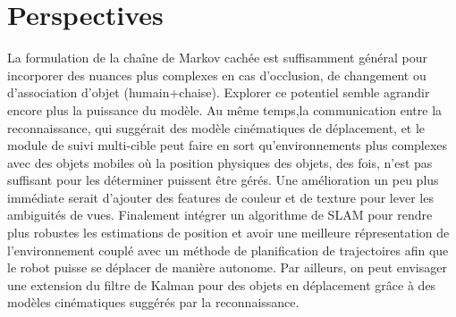 \section{Perspectives} 
 La formulation de la chaîne de Markov cachée est suffisamment général pour incorporer des nuances plus complexes en cas d'occlusion, de changement ou d'association d'objet (humain+chaise). Explorer ce potentiel semble agrandir encore plus la puissance du modèle. Au même temps,la communication entre la reconnaissance, qui suggérait des modèle cinématiques de déplacement, et le module de suivi multi-cible peut faire en sort qu'environnements plus complexes avec des objets mobiles où la position physiques des objets, des fois, n'est pas suffisant pour les déterminer puissent être gérés. Une amélioration un peu plus immédiate serait d'ajouter des features de couleur et de texture pour lever les ambiguités de vues.  Finalement intégrer un algorithme de SLAM pour rendre plus robustes les estimations de position et avoir une meilleure répresentation de l'environnement couplé avec un méthode de planification de trajectoires afin que le robot puisse se déplacer de manière autonome. Par ailleurs, on peut envisager une extension du filtre de Kalman pour des objets en déplacement grâce à des modèles cinématiques suggérés par la reconnaissance.






